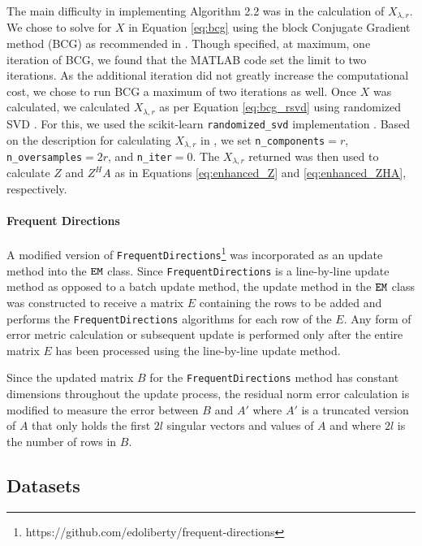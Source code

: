 The main difficulty in implementing Algorithm 2.2 was in the calculation of $X_{\lambda,r}$. We chose to solve for $X$ in Equation \ref{eq:bcg} using the block Conjugate Gradient method (BCG) \cite{OLeary1980} as recommended in \cite{Kalantzis2021}. Though \cite{Kalantzis2021} specified, at maximum, one iteration of BCG, we found that the MATLAB code set the limit to two iterations. As the additional iteration did not greatly increase the computational cost, we chose to run BCG a maximum of two iterations as well. Once $X$ was calculated, we calculated $X_{\lambda,r}$ as per Equation \ref{eq:bcg_rsvd} using randomized SVD \cite{Halko2011}. For this, we used the scikit-learn \verb|randomized_svd| implementation \cite{scikit-learn}. Based on the description for calculating $X_{\lambda,r}$ in \cite{Kalantzis2021}, we set \verb|n_components|$=r$, \verb|n_oversamples|$=2r$, and \verb|n_iter|$=0$. The $X_{\lambda,r}$ returned was then used to calculate $Z$ and $Z^H A$ as in Equations \ref{eq:enhanced_Z} and \ref{eq:enhanced_ZHA}, respectively.

\paragraph{Frequent Directions}

A modified version of \verb|FrequentDirections|\footnote{https://github.com/edoliberty/frequent-directions} was incorporated as an update method into the $\verb|EM|$ class.
Since \verb|FrequentDirections| is a line-by-line update method as opposed to a batch update method, the update method in the $\verb|EM|$ class was constructed to receive a matrix $E$ containing the rows to be added and performs the \verb|FrequentDirections| algorithms for each row of the $E$.
Any form of error metric calculation or subsequent update is performed only after the entire matrix $E$ has been processed using the line-by-line update method.

Since the updated matrix $B$ for the \verb|FrequentDirections| method has constant dimensions throughout the update process, the residual norm error calculation is modified to measure the error between $B$ and $A'$ where $A'$ is a truncated version of $A$ that only holds the first $2l$ singular vectors and values of $A$ and where $2l$ is the number of rows in $B$.

\subsection{Datasets}

